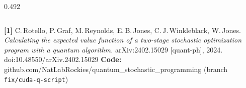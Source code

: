 \documentclass[final]{beamer}
\begin{document}
\begin{frame}[t]{}
\begin{columns}[T,totalwidth=\linewidth]
\begin{column}{0.492\linewidth}
\end{column}
\end{columns}

\vspace{0.4cm}
\begin{tcolorbox}[
    enhanced, arc=0pt, boxrule=0pt,
    colback=titleblue, colframe=titleblue,
    top=10pt, bottom=10pt, left=6pt, right=6pt,
    before skip=0pt, after skip=0pt,
]
{\color{white}\small\raggedright\sloppy
  \textbf{[1]}\;
  C.\,Rotello, P.\,Graf, M.\,Reynolds, E.\,B.\,Jones,
  C.\,J.\,Winkleblack, W.\,Jones.
  \textit{Calculating the expected value function of a two-stage stochastic
  optimization program with a quantum algorithm.}
  arXiv:2402.15029 [quant-ph], 2024.\;
  doi:10.48550/arXiv.2402.15029
  \hfill
  \textbf{Code:}\;
  github.com/NatLabRockies/quantum\_stochastic\_programming
  \;(branch \texttt{fix/cuda-q-script})
}
\end{tcolorbox}

\end{frame}
\end{document}
